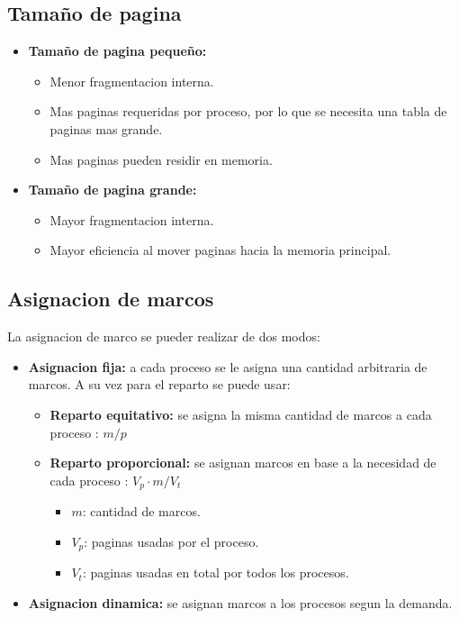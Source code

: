\documentclass[12pt]{article}
\begin{document}
\subsection{Tamaño de pagina}
\begin{itemize}
    \item \textbf{Tamaño de pagina pequeño:}
        \begin{itemize}
            \item Menor fragmentacion interna.
    \item Mas paginas requeridas por proceso, por lo que se necesita una tabla de paginas mas grande.
    \item Mas paginas pueden residir en memoria.
\end{itemize}
    \item \textbf{Tamaño de pagina grande:}
        \begin{itemize}
    \item Mayor fragmentacion interna.
    \item Mayor eficiencia al mover paginas hacia la memoria principal.
        \end{itemize}
\end{itemize}

\subsection{Asignacion de marcos}
La asignacion de marco se pueder realizar de dos modos:
\begin{itemize}
    \item \textbf{Asignacion fija:} a cada proceso se le asigna una cantidad arbitraria de marcos. A su vez para el reparto se puede usar:
        \begin{itemize}
            \item \textbf{Reparto equitativo:} se asigna la misma cantidad de marcos a cada proceso : $m / p$
            \item \textbf{Reparto proporcional:} se asignan marcos en base a la necesidad de cada proceso : $V_p \cdot m /V_t$
                \begin{itemize}
                    \item $m$: cantidad de marcos.
                    \item $V_p$: paginas usadas por el proceso.
                    \item $V_t$: paginas usadas en total por todos los procesos.
                \end{itemize}
        \end{itemize}
        \item \textbf{Asignacion dinamica:} se asignan marcos a los procesos segun la demanda.
\end{itemize}
\end{document}
